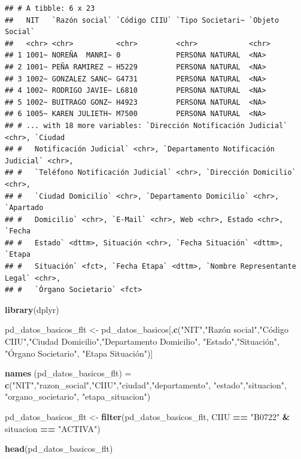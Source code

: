 \documentclass[
  11pt,
]{article}
\newenvironment{Shaded}{\begin{snugshade}}{\end{snugshade}}
\newcommand{\KeywordTok}[1]{\textcolor[rgb]{0.13,0.29,0.53}{\textbf{#1}}}
\newcommand{\NormalTok}[1]{#1}
\newcommand{\OperatorTok}[1]{\textcolor[rgb]{0.81,0.36,0.00}{\textbf{#1}}}
\newcommand{\StringTok}[1]{\textcolor[rgb]{0.31,0.60,0.02}{#1}}
\begin{document}
\begin{verbatim}
## # A tibble: 6 x 23
##   NIT   `Razón social` `Código CIIU` `Tipo Societari~ `Objeto Social`
##   <chr> <chr>          <chr>         <chr>            <chr>          
## 1 1001~ NOREÑA  MANRI~ 0             PERSONA NATURAL  <NA>           
## 2 1001~ PEÑA RAMIREZ ~ H5229         PERSONA NATURAL  <NA>           
## 3 1002~ GONZALEZ SANC~ G4731         PERSONA NATURAL  <NA>           
## 4 1002~ RODRIGO JAVIE~ L6810         PERSONA NATURAL  <NA>           
## 5 1002~ BUITRAGO GONZ~ H4923         PERSONA NATURAL  <NA>           
## 6 1005~ KAREN JULIETH~ M7500         PERSONA NATURAL  <NA>           
## # ... with 18 more variables: `Dirección Notificación Judicial` <chr>, `Ciudad
## #   Notificación Judicial` <chr>, `Departamento Notificación Judicial` <chr>,
## #   `Teléfono Notificación Judicial` <chr>, `Dirección Domicilio` <chr>,
## #   `Ciudad Domicilio` <chr>, `Departamento Domicilio` <chr>, `Apartado
## #   Domicilio` <chr>, `E-Mail` <chr>, Web <chr>, Estado <chr>, `Fecha
## #   Estado` <dttm>, Situación <chr>, `Fecha Situación` <dttm>, `Etapa
## #   Situación` <fct>, `Fecha Etapa` <dttm>, `Nombre Representante Legal` <chr>,
## #   `Órgano Societario` <fct>
\end{verbatim}

\begin{Shaded}
\begin{Highlighting}[]
\KeywordTok{library}\NormalTok{(dplyr)}

\NormalTok{pd_datos_basicos_flt <-}\StringTok{ }\NormalTok{pd_datos_basicos[,}\KeywordTok{c}\NormalTok{(}\StringTok{"NIT"}\NormalTok{,}\StringTok{"Razón social"}\NormalTok{,}\StringTok{"Código CIIU"}\NormalTok{,}\StringTok{"Ciudad Domicilio"}\NormalTok{,}\StringTok{"Departamento Domicilio"}\NormalTok{, }\StringTok{"Estado"}\NormalTok{,}\StringTok{"Situación", "}\NormalTok{Órgano Societario}\StringTok{", "}\NormalTok{Etapa Situación")]}

\KeywordTok{names}\NormalTok{ (pd_datos_basicos_flt) =}\StringTok{ }\KeywordTok{c}\NormalTok{(}\StringTok{"NIT"}\NormalTok{,}\StringTok{"razon_social"}\NormalTok{,}\StringTok{"CIIU"}\NormalTok{,}\StringTok{"ciudad"}\NormalTok{,}\StringTok{"departamento"}\NormalTok{, }\StringTok{"estado"}\NormalTok{,}\StringTok{"situacion"}\NormalTok{, }\StringTok{"organo_societario"}\NormalTok{,}
                                 \StringTok{"etapa_situacion"}\NormalTok{)}

\NormalTok{pd_datos_basicos_flt <-}\StringTok{ }\KeywordTok{filter}\NormalTok{(pd_datos_basicos_flt, CIIU }\OperatorTok{==}\StringTok{ "B0722"} \OperatorTok{&}\StringTok{ }\NormalTok{situacion }\OperatorTok{==}\StringTok{ "ACTIVA"}\NormalTok{)}

\KeywordTok{head}\NormalTok{(pd_datos_basicos_flt)}
\end{Highlighting}
\end{Shaded}
\end{document}
